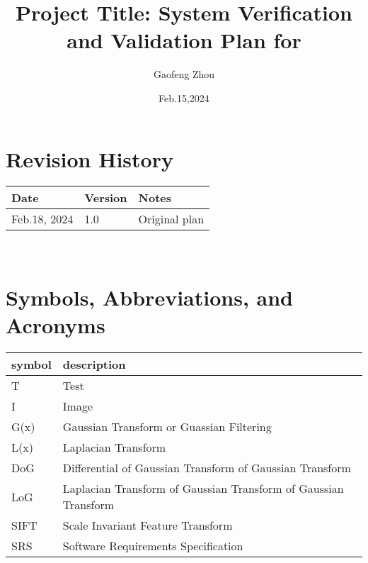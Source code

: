 \documentclass[12pt, titlepage]{article}
\begin{document}
\title{Project Title: System Verification and Validation Plan for\\ } 
\author{Gaofeng Zhou}
\date{Feb.15,2024}
	
\maketitle


\section*{Revision History}

\begin{tabularx}{\textwidth}{p{3cm}p{2cm}X}
\toprule {\bf Date} & {\bf Version} & {\bf Notes}\\
\midrule
Feb.18, 2024 & 1.0 & Original plan\\

\bottomrule
\end{tabularx}

~\\


\newpage

\tableofcontents

\newpage


\newpage

\section{Symbols, Abbreviations, and Acronyms}

\renewcommand{\arraystretch}{1.2}
\begin{tabular}{l l} 
  \toprule		
  \textbf{symbol} & \textbf{description}\\
  \midrule 
  T & Test\\
  I & Image\\
  
G(x)& Gaussian Transform or Guassian Filtering\\
L(x)& Laplacian Transform\\
DoG &Differential of Gaussian Transform of Gaussian Transform\\
LoG &Laplacian Transform of Gaussian Transform of Gaussian Transform\\
SIFT& Scale Invariant Feature Transform\\
SRS &Software Requirements Specification\\
  
  \bottomrule
\end{tabular}\\
\end{document}
